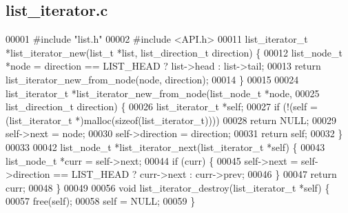 \subsection{list\+\_\+iterator.\+c}
\label{list__iterator_8c_source}

\begin{DoxyCode}
00001 \textcolor{preprocessor}{#include "list.h"}
00002 \textcolor{preprocessor}{#include <API.h>}
00011 list_iterator_t *list_iterator_new(list_t *list, list_direction_t direction) \{
00012   list_node_t *node = direction == LIST_HEAD ? list->head : list->tail;
00013   \textcolor{keywordflow}{return} list_iterator_new_from_node(node, direction);
00014 \}
00015 
00024 list_iterator_t *list_iterator_new_from_node(list_node_t *node,
00025                                              list_direction_t direction) \{
00026   list_iterator_t *\textcolor{keyword}{self};
00027   \textcolor{keywordflow}{if} (!(\textcolor{keyword}{self} = (list_iterator_t *)malloc(\textcolor{keyword}{sizeof}(list_iterator_t))))
00028     \textcolor{keywordflow}{return} NULL;
00029   \textcolor{keyword}{self}->next = node;
00030   \textcolor{keyword}{self}->direction = direction;
00031   \textcolor{keywordflow}{return} \textcolor{keyword}{self};
00032 \}
00033 
00042 list_node_t *list_iterator_next(list_iterator_t *\textcolor{keyword}{self}) \{
00043   list_node_t *curr = \textcolor{keyword}{self}->next;
00044   \textcolor{keywordflow}{if} (curr) \{
00045     \textcolor{keyword}{self}->next = \textcolor{keyword}{self}->direction == LIST_HEAD ? curr->next : curr->prev;
00046   \}
00047   \textcolor{keywordflow}{return} curr;
00048 \}
00049 
00056 \textcolor{keywordtype}{void} list_iterator_destroy(list_iterator_t *\textcolor{keyword}{self}) \{
00057   free(\textcolor{keyword}{self});
00058   \textcolor{keyword}{self} = NULL;
00059 \}
\end{DoxyCode}
